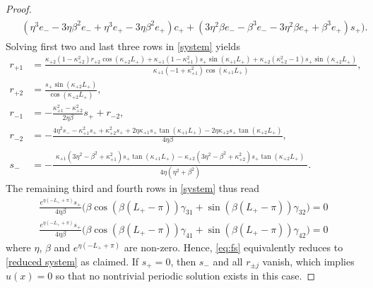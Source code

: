 \documentclass[10pt,a4paper]{amsart}
\begin{document}
\begin{proof}
\begin{align}
\begin{split}
				&
				(\eta^3 e_-  - 3\eta \beta^2 e_-  + \eta^3 e_+  - 3\eta \beta^2 e_+) c_+ 
				+ (3\eta^2 \beta e_-  - \beta^3 e_-  - 3\eta^2 \beta e_+  + \beta^3 e_+ ) s_+				
				\big).
			\end{split}
		\end{align}
		Solving first two and last three rows in \eqref{system} yields
		\begin{equation} \label{eq:rs}
		\begin{aligned}
			r_{+1} &= 
			\frac{
					\kappa_{+2} (1-\kappa_{+2}^2) r_{+2} \cos(\kappa_{+2} L_+) 
					+ \kappa_{+1} (1 - \kappa_{+1}^2) s_+ \sin(\kappa_{+1} L_+)  
					+ \kappa_{+2} (\kappa_{+2}^2-1) s_+ \sin(\kappa_{+2} L_+) 
			}{
				\kappa_{+1} (-1 + \kappa_{+1}^2) \cos(\kappa_{+1} L_+)
			},\\
			r_{+2} &= \frac{s_+ \sin(\kappa_{+2} L_+)}{\cos(\kappa_{+2} L_+)},\\
			r_{-1} &= -\frac{\kappa_{+1}^2 - \kappa_{+2}^2}{2 \eta \beta} s_+ + r_{-2},\\
			r_{-2} &= -
			\frac{
					4 \eta^2 s_- -\kappa_{+1}^2 s_+ + \kappa_{+2}^2 s_+ 
					+ 2\eta \kappa_{+1} s_+ \tan(\kappa_{+1} L_+) 
					- 2\eta \kappa_{+2} s_+ \tan(\kappa_{+2} L_+)
			}{4 \eta \beta},\\
			s_- &= -
			\frac{
				\begin{aligned}
					\kappa_{+1}(3\eta^2 -\beta^2 +\kappa_{+1}^2) s_+ \tan(\kappa_{+1} L_+) 
					-\kappa_{+2}(3\eta^2 -\beta^2 +\kappa_{+2}^2) s_+ \tan(\kappa_{+2} L_+)
				\end{aligned}				
			}{4\eta (\eta^2 + \beta^2)}.
		\end{aligned}\end{equation}		
The remaining third and fourth rows in \eqref{system} thus read
		\begin{equation}\label{eq:fs}
		\begin{aligned}
			\frac{e^{\eta (-L_+ + \pi)}s_+}{4 \eta \beta} \bigl( \beta \cos(\beta(L_+-\pi)) \gamma_{31} + \sin(\beta(L_+-\pi)) \gamma_{32} \bigl) =0\\
			\frac{e^{\eta (-L_+ + \pi)}s_+}{4 \eta \beta} \bigl( \beta \cos(\beta(L_+-\pi)) \gamma_{41} + \sin(\beta(L_+-\pi)) \gamma_{42} \bigl) =0
		\end{aligned}
		\end{equation}
		where $\eta$, $\beta$ and $e^{\eta(-L_+ + \pi)}$ are non-zero. 
		Hence, \eqref{eq:fs} equivalently reduces to \eqref{reduced system} as claimed. 
		If $s_+ = 0$, then $s_{-}$ and all $r_{\pm j}$ vanish, which implies $u(x)=0$ so that no nontrivial periodic solution exists in this case.
	\end{proof}
\end{document}
